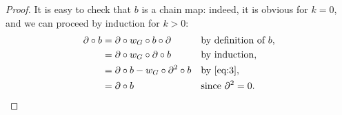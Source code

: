 \begin{proof}
  It is easy to check that $b$ is a chain map: indeed, it is obvious
  for $k=0$, and we can proceed by induction for $k>0$:
  \begin{align*}
    \partial \circ b 
    &= \partial \circ w_G \circ b \circ \partial 
    && \text{by definition of $b$,} 
    \\
    &= \partial \circ w_G \circ \partial \circ b
    && \text{by induction,}
    \\
    &= \partial \circ b - w_G \circ \partial^2 \circ b
    && \text{by \eqref{eq:3},}
    \\
    &= \partial \circ b
    && \text{since $\partial^2=0$.}
  \end{align*}
\end{proof}


